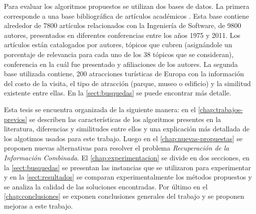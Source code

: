 Para evaluar los algoritmos propuestos se utilizan dos bases de datos. La primera corresponde a una base bibliográfica de artículos académicos \cite{dataDrive}. Esta base contiene alrededor de 7800 artículos relacionados con la Ingeniería de Software, de 9800 autores, presentados en diferentes conferencias entre los años 1975 y 2011. Los artículos están catalogados por autores, tópicos que cubren (asignándole un porcentaje de relevancia para cada uno de los 38 tópicos que se consideran), conferencia en la cuál fue presentado y afiliaciones de los autores. La segunda base utilizada contiene, 200 atracciones turísticas de Europa con la información del costo de la visita, el tipo de atracción (parque, museo o edificio) y la similitud existente entre ellas. En la \autoref{sect:busquedas} se puede encontrar más detalle.

Esta tesis se encuentra organizada de la siguiente manera: en el \autoref{chap:trabajos-previos} se describen las características de los algoritmos presentes en la literatura, diferencias y similitudes entre ellos y una explicación más detallada de los algotimos usados para este trabajo. Luego en el \autoref{chap:nuevas-propuestas} se proponen nuevas alternativas para resolver el problema {\em Recuperación de la Información Combinada}. El \autoref{chap:experimentacion} se divide en dos secciones, en la \autoref{sect:busquedas} se presentan las instancias que se utilizaron para experimentar y en la \autoref{sect:resultados} se 
comparan experimentalmente los métodos propuestos y se analiza la calidad de las soluciones encontradas. Por último en el \autoref{chap:conclusiones} se exponen conclusiones generales del trabajo y se proponen mejoras a este trabajo.
